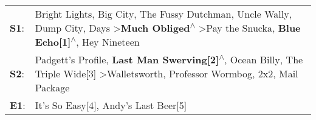 \begin{supertabular}{p{0.03\textwidth}p{0.92\textwidth}}
 \textbf{S1}:  &  Bright Lights, Big City\textsuperscript{}, \enspace The Fussy Dutchman\textsuperscript{}, \enspace Uncle Wally\textsuperscript{}, \enspace Dump City\textsuperscript{},  Days\textsuperscript{} \textgreater \enspace \textbf{Much Obliged\textsuperscript{$\wedge$}} \textgreater \enspace Pay the Snucka\textsuperscript{}, \enspace \textbf{Blue Echo[1]\textsuperscript{$\wedge$}}, \enspace Hey Nineteen\textsuperscript{}  \enspace  \\
 \textbf{S2}:  &                                                                    Padgett's Profile\textsuperscript{}, \enspace \textbf{Last Man Swerving[2]\textsuperscript{$\wedge$}}, \enspace Ocean Billy\textsuperscript{}, \enspace The Triple Wide[3]\textsuperscript{} \textgreater \enspace Walletsworth\textsuperscript{}, \enspace Professor Wormbog\textsuperscript{}, \enspace 2x2\textsuperscript{}, \enspace Mail Package\textsuperscript{}  \enspace  \\
 \textbf{E1}:  &                                                                                                                                                                                                                                                                                                                                                           It's So Easy[4]\textsuperscript{}, \enspace Andy's Last Beer[5]\textsuperscript{}  \enspace  \\
\end{supertabular}
